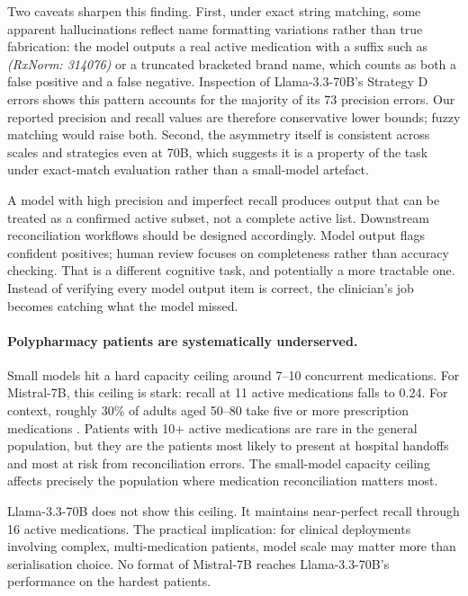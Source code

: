 Two caveats sharpen this finding. First, under exact string matching, some apparent
hallucinations reflect name formatting variations rather than true fabrication: the
model outputs a real active medication with a suffix such as \textit{(RxNorm: 314076)}
or a truncated bracketed brand name, which counts as both a false positive and a false
negative. Inspection of Llama-3.3-70B's Strategy D errors shows this pattern accounts
for the majority of its 73 precision errors. Our reported precision and recall values
are therefore conservative lower bounds; fuzzy matching would raise both. Second,
the asymmetry itself is consistent across scales and strategies even at 70B, which
suggests it is a property of the task under exact-match evaluation rather than a
small-model artefact.

A model with high precision and imperfect recall produces output that can be treated
as a confirmed active subset, not a complete active list. Downstream reconciliation
workflows should be designed accordingly. Model output flags confident positives;
human review focuses on completeness rather than accuracy checking. That is a
different cognitive task, and potentially a more tractable one. Instead of verifying
every model output item is correct, the clinician's job becomes catching what the
model missed.

\paragraph{Polypharmacy patients are systematically underserved.}
Small models hit a hard capacity ceiling around 7--10 concurrent medications. For
Mistral-7B, this ceiling is stark: recall at 11 active medications falls to 0.24.
For context, roughly 30\% of adults aged 50--80 take five or more prescription
medications \citep{lantz2020polypharmacy}. Patients with 10+ active medications are
rare in the general population, but they are the patients most likely to present at
hospital handoffs and most at risk from reconciliation errors. The small-model capacity
ceiling affects precisely the population where medication reconciliation matters most.

Llama-3.3-70B does not show this ceiling. It maintains near-perfect recall through
16 active medications. The practical implication: for clinical deployments involving
complex, multi-medication patients, model scale may matter more than serialisation
choice. No format of Mistral-7B reaches Llama-3.3-70B's performance on the hardest
patients.

